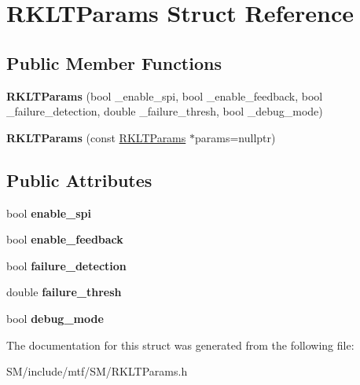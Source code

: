 \hypertarget{structRKLTParams}{\section{R\-K\-L\-T\-Params Struct Reference}
\label{structRKLTParams}
}
\subsection*{Public Member Functions}
\begin{DoxyCompactItemize}
\item 
\hypertarget{structRKLTParams_a01a4dc7d9b397584dee6ee1517897945}{{\bfseries R\-K\-L\-T\-Params} (bool \-\_\-enable\-\_\-spi, bool \-\_\-enable\-\_\-feedback, bool \-\_\-failure\-\_\-detection, double \-\_\-failure\-\_\-thresh, bool \-\_\-debug\-\_\-mode)}\label{structRKLTParams_a01a4dc7d9b397584dee6ee1517897945}

\item 
\hypertarget{structRKLTParams_a97d6e5e5ce4fb045c09392378a76f14a}{{\bfseries R\-K\-L\-T\-Params} (const \hyperlink{structRKLTParams}{R\-K\-L\-T\-Params} $\ast$params=nullptr)}\label{structRKLTParams_a97d6e5e5ce4fb045c09392378a76f14a}

\end{DoxyCompactItemize}
\subsection*{Public Attributes}
\begin{DoxyCompactItemize}
\item 
\hypertarget{structRKLTParams_a18ed0b98c6a2181f78464d63983c853a}{bool {\bfseries enable\-\_\-spi}}\label{structRKLTParams_a18ed0b98c6a2181f78464d63983c853a}

\item 
\hypertarget{structRKLTParams_a47a3e735a6e0256b2796702d8c37dd3f}{bool {\bfseries enable\-\_\-feedback}}\label{structRKLTParams_a47a3e735a6e0256b2796702d8c37dd3f}

\item 
\hypertarget{structRKLTParams_a37f664deee48fcd39a1e817d5ac59dfa}{bool {\bfseries failure\-\_\-detection}}\label{structRKLTParams_a37f664deee48fcd39a1e817d5ac59dfa}

\item 
\hypertarget{structRKLTParams_a9a9f3df4eb55ec3b34ead3e859797848}{double {\bfseries failure\-\_\-thresh}}\label{structRKLTParams_a9a9f3df4eb55ec3b34ead3e859797848}

\item 
\hypertarget{structRKLTParams_ac1cee611416c70a47466c073b7a778fd}{bool {\bfseries debug\-\_\-mode}}\label{structRKLTParams_ac1cee611416c70a47466c073b7a778fd}

\end{DoxyCompactItemize}


The documentation for this struct was generated from the following file\-:\begin{DoxyCompactItemize}
\item 
S\-M/include/mtf/\-S\-M/R\-K\-L\-T\-Params.\-h\end{DoxyCompactItemize}
